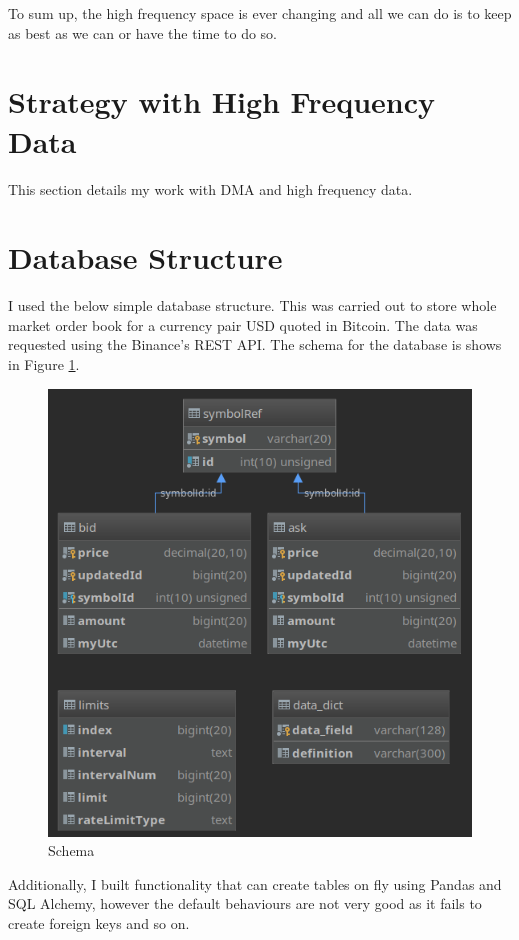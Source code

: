 \documentclass[12pt]{article}
\begin{document}
To sum up, the high frequency space is ever changing and all we can do is to keep as best as we can or have the time to do so.

\section*{Strategy with High Frequency Data}
This section details my work with DMA and high frequency data.
\section*{Database Structure}
I used the below simple database structure. This was carried out to store whole market order book for  a currency pair USD quoted in Bitcoin. The data was requested using the Binance's REST API. The schema for the database is shows in Figure \ref{fig:schema}.\\
\begin{figure}[h!]
  \centering
  \includegraphics[scale=0.40]{schema.png}
  \caption{Schema}
  \label{fig:schema}
\end{figure}
\FloatBarrier

Additionally, I built functionality that can create tables on fly using Pandas and SQL Alchemy, however the default behaviours are not very good as it fails to create foreign keys and so on.
\end{document}
